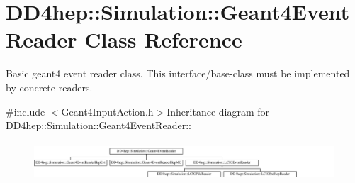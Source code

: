 \hypertarget{class_d_d4hep_1_1_simulation_1_1_geant4_event_reader}{
\section{DD4hep::Simulation::Geant4EventReader Class Reference}
\label{class_d_d4hep_1_1_simulation_1_1_geant4_event_reader}
}


Basic geant4 event reader class. This interface/base-\/class must be implemented by concrete readers.  


{\ttfamily \#include $<$Geant4InputAction.h$>$}Inheritance diagram for DD4hep::Simulation::Geant4EventReader::\begin{figure}[H]
\begin{center}
\leavevmode
\includegraphics[height=1.4433cm]{class_d_d4hep_1_1_simulation_1_1_geant4_event_reader}
\end{center}
\end{figure}
